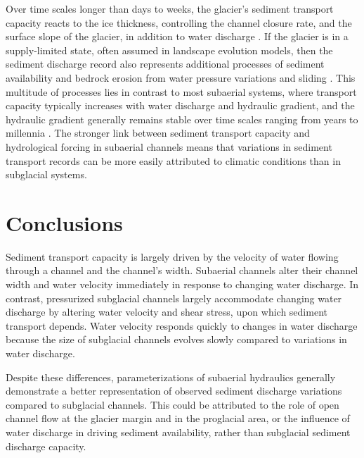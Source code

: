 \documentclass[11pt]{article}
\begin{document}
Over time scales longer than days to weeks, the glacier's sediment transport capacity reacts to the ice thickness, controlling the channel closure rate, and the surface slope of the glacier, in addition to water discharge \citep[Figure~\ref{fig:multi_run}, ~ Section~\ref{sect:sub_mode}; ][]{rothlisberger1972,shreve1972,stevens2022}.
If the glacier is in a supply-limited state, often assumed in landscape evolution models, then the sediment discharge record also represents additional processes of sediment availability and bedrock erosion from  water pressure variations and sliding  \citep[e.g.][]{iverson2012,herman2015,delaney2023}.
This multitude of processes lies in contrast to most subaerial systems, where transport capacity typically increases with water discharge and hydraulic gradient, and the hydraulic gradient generally remains stable over time scales ranging from years to millennia \citep[Section~\ref{sect:fluv}; e.g.][]{muller1968,whipple1999,wickert2019}.
The stronger link between sediment transport capacity and hydrological forcing in subaerial channels means that variations in sediment transport records can be more easily attributed to climatic conditions than in  subglacial systems.



\section{Conclusions}

Sediment transport capacity is largely driven by the velocity of water flowing through a channel and the channel's width.
Subaerial channels  alter their channel width and water velocity immediately in response to changing water discharge.
In contrast, pressurized subglacial channels largely accommodate changing water discharge by altering water velocity and shear stress, upon which sediment transport depends.
Water velocity responds quickly to changes in water discharge because the size of subglacial channels evolves slowly compared to variations in water discharge.

Despite these differences, parameterizations of subaerial hydraulics generally demonstrate a better representation of observed sediment discharge variations compared to subglacial channels.
This could be attributed to the role of open channel flow at the glacier margin and in the proglacial area, or the influence of water discharge in driving sediment availability, rather than subglacial sediment discharge capacity.
\end{document}
